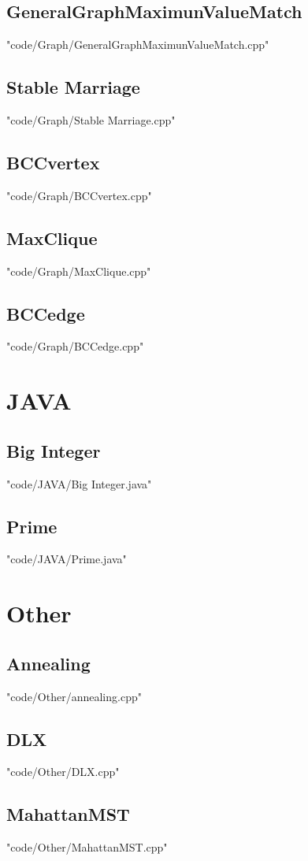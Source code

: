 \documentclass [8pt,a4paper,twocolumn]{article}
\begin{document}
\subsection{GeneralGraphMaximunValueMatch}
 {"code/Graph/GeneralGraphMaximunValueMatch.cpp"}
\subsection{Stable Marriage}
 {"code/Graph/Stable Marriage.cpp"}
\subsection{BCCvertex}
 {"code/Graph/BCCvertex.cpp"}
\subsection{MaxClique}
 {"code/Graph/MaxClique.cpp"}
\subsection{BCCedge}
 {"code/Graph/BCCedge.cpp"}
\section{JAVA}
\subsection{Big Integer}
 {"code/JAVA/Big Integer.java"}
\subsection{Prime}
 {"code/JAVA/Prime.java"}
\section{Other}
\subsection{Annealing}
 {"code/Other/annealing.cpp"}
\subsection{DLX}
 {"code/Other/DLX.cpp"}
\subsection{MahattanMST}
 {"code/Other/MahattanMST.cpp"}
\end{document}
